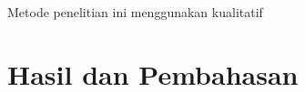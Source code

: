\documentclass[fleqn,10pt]{SelfArx} %
\begin{document}
Metode penelitian ini menggunakan kualitatif












\section{Hasil dan Pembahasan}

\end{document}
